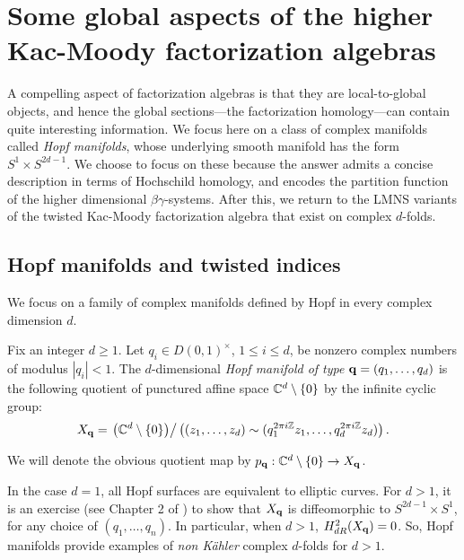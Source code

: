 \section{Some global aspects of the higher Kac-Moody factorization algebras}

A compelling aspect of factorization algebras is that they are local-to-global objects,
and hence the global sections---the factorization homology---can contain quite interesting information.
We focus here on a class of complex manifolds called {\em Hopf manifolds},
whose underlying smooth manifold has the form $S^1 \times S^{2d-1}$.
We choose to focus on these because the answer admits a concise description in terms of Hochschild homology, and encodes the partition function of the higher dimensional $\beta\gamma$-systems. 
After this, we return to the LMNS variants of the twisted Kac-Moody factorization algebra that exist on complex $d$-folds.

\subsection{Hopf manifolds and twisted indices}

We focus on a family of complex manifolds defined by Hopf \cite{Hopf} in every complex dimension $d$. 

\begin{dfn}
Fix an integer $d \geq 1$. 
Let $q_i \in D(0,1)^{\times}$, $1 \leq i \leq d$, be nonzero complex numbers of modulus $|q_i| <1$. 
The $d$-dimensional {\em Hopf manifold of type} ${\bf q} = (q_1,\ldots,q_d)$ is the following quotient of punctured affine space $\mathbb C^d \setminus \{0\}$ by the infinite cyclic group:
\[
X_{\bf q} = \left. \left(\mathbb C^d \setminus \{0\}\right) \right/ \left( (z_1,\ldots,z_d) \sim (q_1^{2\pi i \mathbb Z} z_1, \ldots,q_d^{2 \pi i \mathbb Z} z_d) \right) .
\]
\end{dfn}

We will denote the obvious quotient map by $p_{\bf q} : \mathbb C^d \setminus \{0\} \to X_{\bf q}$. 

\begin{rmk}
In the case $d=1$, all Hopf surfaces are equivalent to elliptic curves.
For $d>1$, it is an exercise (see Chapter 2 of \cite{KodairaDef}) to show that $X_{\bf q}$ is diffeomorphic to $S^{2d-1} \times S^1$, for any choice of $(q_1,\ldots,q_n)$. 
In particular, when $d > 1$, $H^{2}_{dR} (X_{\bf q}) = 0$.
So, Hopf manifolds provide examples of {\em non K\"{a}hler} complex $d$-folds for $d > 1$. 
\end{rmk}

